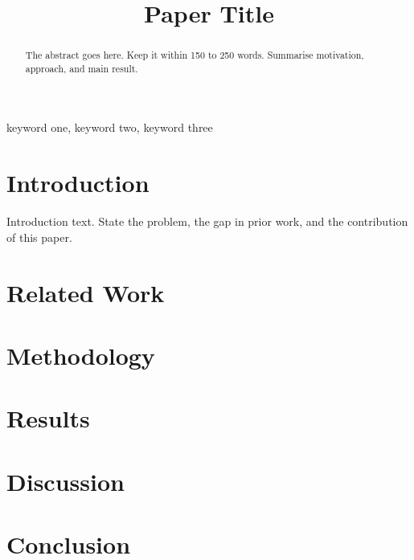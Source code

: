 \documentclass[conference]{IEEEtran}
\begin{document}
\title{Paper Title}

\author{
\and
{}
}

\maketitle

\begin{abstract}
The abstract goes here. Keep it within 150 to 250 words. Summarise motivation, approach, and main result.
\end{abstract}

\begin{IEEEkeywords}
keyword one, keyword two, keyword three
\end{IEEEkeywords}

\section{Introduction}
\label{sec:introduction}

Introduction text. State the problem, the gap in prior work, and the contribution of this paper.

\section{Related Work}
\label{sec:related}

\section{Methodology}
\label{sec:method}

\section{Results}
\label{sec:results}

\section{Discussion}
\label{sec:discussion}

\section{Conclusion}
\label{sec:conclusion}



\end{document}
